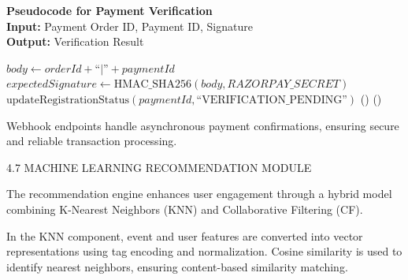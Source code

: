 \noindent\textbf{Pseudocode for Payment Verification} 
\vspace{.2em} \\
\noindent\textbf{Input:} Payment Order ID, Payment ID, Signature\\
\noindent\textbf{Output:} Verification Result
\begin{algorithmic}[1]
    \State $body \gets orderId + \text{``|''} + paymentId$
    \State $expectedSignature \gets \text{HMAC\_SHA256}(body, RAZORPAY\_SECRET)$
        \State $\text{updateRegistrationStatus}(paymentId, \text{``VERIFICATION\_PENDING''})$
        \State \Return {}()
    \Else
        \State \Return {}()
    \EndIf
\EndFunction
\end{algorithmic}

Webhook endpoints handle asynchronous payment confirmations, ensuring secure and reliable transaction processing.

4.7 MACHINE LEARNING RECOMMENDATION MODULE

The recommendation engine enhances user engagement through a hybrid model combining K-Nearest Neighbors (KNN) and Collaborative Filtering (CF).

In the KNN component, event and user features are converted into vector representations using tag encoding and normalization. Cosine similarity is used to identify nearest neighbors, ensuring content-based similarity matching.

